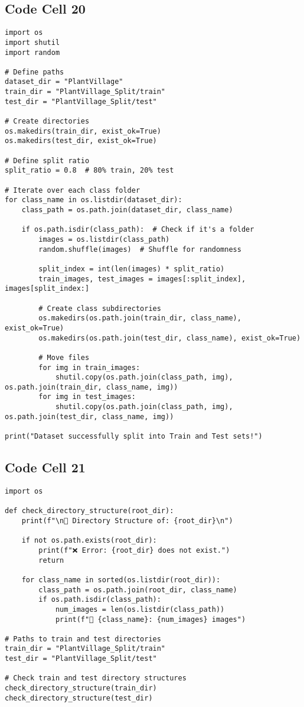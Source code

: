 \documentclass{article}
\begin{document}
\subsection*{Code Cell 20}
\begin{lstlisting}
import os
import shutil
import random

# Define paths
dataset_dir = "PlantVillage"
train_dir = "PlantVillage_Split/train"
test_dir = "PlantVillage_Split/test"

# Create directories
os.makedirs(train_dir, exist_ok=True)
os.makedirs(test_dir, exist_ok=True)

# Define split ratio
split_ratio = 0.8  # 80% train, 20% test

# Iterate over each class folder
for class_name in os.listdir(dataset_dir):
    class_path = os.path.join(dataset_dir, class_name)

    if os.path.isdir(class_path):  # Check if it's a folder
        images = os.listdir(class_path)
        random.shuffle(images)  # Shuffle for randomness

        split_index = int(len(images) * split_ratio)
        train_images, test_images = images[:split_index], images[split_index:]

        # Create class subdirectories
        os.makedirs(os.path.join(train_dir, class_name), exist_ok=True)
        os.makedirs(os.path.join(test_dir, class_name), exist_ok=True)

        # Move files
        for img in train_images:
            shutil.copy(os.path.join(class_path, img), os.path.join(train_dir, class_name, img))
        for img in test_images:
            shutil.copy(os.path.join(class_path, img), os.path.join(test_dir, class_name, img))

print("Dataset successfully split into Train and Test sets!")
\end{lstlisting}

\subsection*{Code Cell 21}
\begin{lstlisting}
import os

def check_directory_structure(root_dir):
    print(f"\n📂 Directory Structure of: {root_dir}\n")

    if not os.path.exists(root_dir):
        print(f"❌ Error: {root_dir} does not exist.")
        return

    for class_name in sorted(os.listdir(root_dir)):
        class_path = os.path.join(root_dir, class_name)
        if os.path.isdir(class_path):
            num_images = len(os.listdir(class_path))
            print(f"📁 {class_name}: {num_images} images")

# Paths to train and test directories
train_dir = "PlantVillage_Split/train"
test_dir = "PlantVillage_Split/test"

# Check train and test directory structures
check_directory_structure(train_dir)
check_directory_structure(test_dir)
\end{lstlisting}
\end{document}
